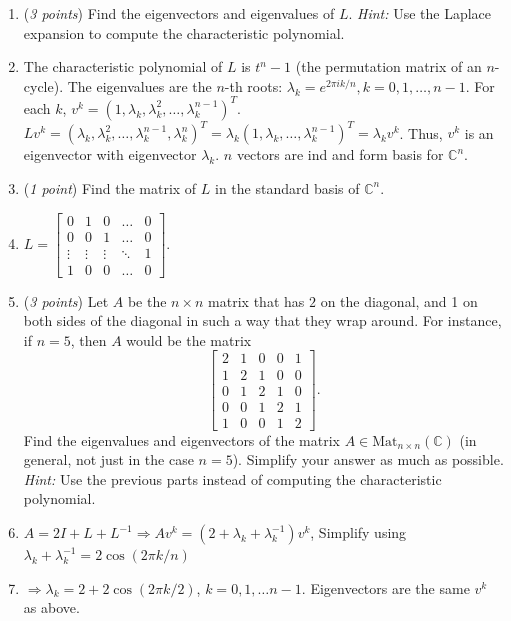 \documentclass[11pt]{article}
\newcommand{\bbC}{\mathbb{C}}
\theoremstyle{definition}
\numberwithin{equation}{subsection}
\begin{document}
\begin{enumerate}
\begin{enumerate}
\item (\emph{3 points}) Find the eigenvectors and eigenvalues of $L$. \textit{Hint:} Use the Laplace expansion to compute the characteristic polynomial. 
\item[] The characteristic polynomial of $L$ is $t^n-1$ (the permutation matrix of an $n$-cycle). The eigenvalues are the $n$-th roots: $\lambda_k=e^{2\pi ik/n}, k=0,1,\ldots,n-1$. For each $k$, $v^k=(1,\lambda_k,\lambda_k^2,\ldots,\lambda_k^{n-1})^T$. $Lv^k=(\lambda_k,\lambda_k^2,\ldots,\lambda_k^{n-1},\lambda_k^n)^T=\lambda_k(1,\lambda_k,\ldots,\lambda_k^{n-1})^T=\lambda_kv^k$. Thus, $v^k$ is an eigenvector with eigenvector $\lambda_k$. $n$ vectors are ind and form basis for $\bbC^n$.

\item (\emph{1 point}) Find the matrix of $L$ in the standard basis of $\mathbb{C}^n$.
\item[] $L=\begin{bmatrix}
    0&1&0&\ldots&0\\0&0&1&\ldots&0\\ \vdots&\vdots&\vdots&\ddots&1\\1&0&0&\ldots&0
\end{bmatrix}$.

\item (\emph{3 points}) Let $A$ be the $n \times n$ matrix that has $2$ on the diagonal, and 1 on both sides of the diagonal in such a way that they wrap around. For instance, if $n=5$, then $A$ would be the matrix
\[
\begin{bmatrix}
2 & 1 & 0 & 0 & 1 \\
1 & 2 & 1 & 0 & 0 \\
0 & 1 & 2 & 1 & 0 \\
0 & 0 & 1 & 2 & 1 \\
1 & 0 & 0 & 1 & 2 
\end{bmatrix}.
\]
Find the eigenvalues and eigenvectors of the matrix $A \in \mathrm{Mat}_{n \times n}(\mathbb{C})$ (in general, not just in the case $n = 5$). Simplify your answer as much as possible. \textit{Hint:} Use the previous parts instead of computing the characteristic polynomial. 
\item[] $A=2I+L+L^{-1}\Rightarrow Av^k=(2+\lambda_k+\lambda_k^{-1})v^k$, Simplify using $\lambda_k+\lambda_k^{-1}=2\cos(2\pi k/n)$
\item[] $\Rightarrow \lambda_k=2+2\cos(2\pi k/2)$, $k=0,1,\ldots n-1$. Eigenvectors are the same $v^k$ as above.

\end{enumerate}


\end{enumerate}
\end{document}

